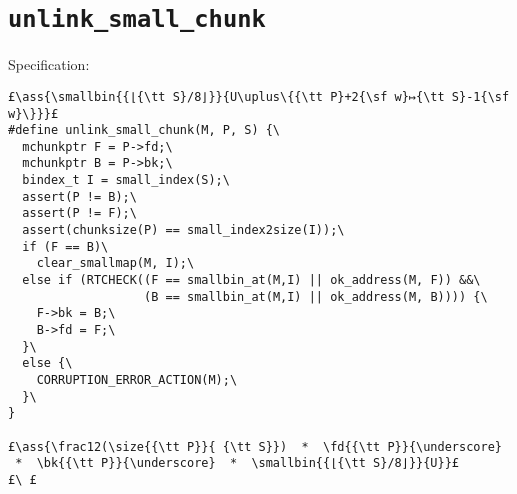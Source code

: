 \documentclass[svgnames,10pt,twoside]{report}
\makeatletter
\newcommand{\ml}[2][t]{\mbox{\mdseries\begin{tabular}[#1]{@{}L@{}}#2\end{tabular}}}
\newcommand{\ass}[1]{\ensuremath{{\color{blue}\left\{\ml[c]{#1}\right\}}}}
\makeatother
\begin{document}
\newpage
\section{{\tt unlink\_small\_chunk}} 

Specification:  
\begin{lstlisting}   
£\ass{\smallbin{{⌊{\tt S}/8⌋}}{U\uplus\{{\tt P}+2{\sf w}↦{\tt S}-1{\sf w}\}}}£
#define unlink_small_chunk(M, P, S) {\
  mchunkptr F = P->fd;\
  mchunkptr B = P->bk;\
  bindex_t I = small_index(S);\
  assert(P != B);\
  assert(P != F);\
  assert(chunksize(P) == small_index2size(I));\
  if (F == B)\
    clear_smallmap(M, I);\
  else if (RTCHECK((F == smallbin_at(M,I) || ok_address(M, F)) &&\
                   (B == smallbin_at(M,I) || ok_address(M, B)))) {\
    F->bk = B;\
    B->fd = F;\
  }\
  else {\
    CORRUPTION_ERROR_ACTION(M);\
  }\
}

£\ass{\frac12(\size{{\tt P}}{ {\tt S}})  *  \fd{{\tt P}}{\underscore}  *  \bk{{\tt P}}{\underscore}  *  \smallbin{{⌊{\tt S}/8⌋}}{U}}£
£\ £
\end{lstlisting}  
\end{document}

